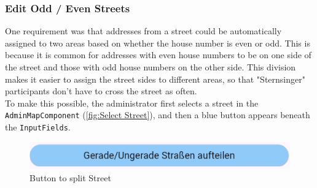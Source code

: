 \newpage


\subsubsection{Edit Odd / Even Streets}
One requirement was that addresses from a street could be automatically assigned to two areas based on whether the house number is even or odd. This is because it is common for addresses with even house numbers to be on one side of the street and those with odd house numbers on the other side. This division makes it easier to assign the street sides to different areas, so that "Sternsinger" participants don't have to cross the street as often.\\ 
To make this possible, the administrator first selects a street in the \texttt{AdminMapComponent} (\ref{fig:Select Street}), and then a blue button appears beneath the \texttt{InputFields}.
\begin{figure}[H]
    \centering
    \includegraphics[width=0.6\linewidth]{images/AdminPanel/splitStreetButton.png}
    \caption{Button to split Street}
\end{figure}

